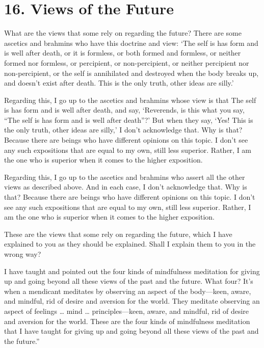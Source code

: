 \documentclass[12pt,openany]{book}%
\begin{document}
\section*{16. Views of the Future }

What are the views that some rely on regarding the future? There are some ascetics and brahmins who have this doctrine and view: ‘The self is has form and is well after death, or it is formless, or both formed and formless, or neither formed nor formless, or percipient, or non-percipient, or neither percipient nor non-percipient, or the self is annihilated and destroyed when the body breaks up, and doesn’t exist after death. This is the only truth, other ideas are silly.’ 

Regarding this, I go up to the ascetics and brahmins whose view is that The self is has form and is well after death, and say, ‘Reverends, is this what you say, “The self is has form and is well after death”?’ But when they say, ‘Yes! This is the only truth, other ideas are silly,’ I don’t acknowledge that. Why is that? Because there are beings who have different opinions on this topic. I don’t see any such expositions that are equal to my own, still less superior. Rather, I am the one who is superior when it comes to the higher exposition. 

Regarding this, I go up to the ascetics and brahmins who assert all the other views as described above. And in each case, I don’t acknowledge that. Why is that? Because there are beings who have different opinions on this topic. I don’t see any such expositions that are equal to my own, still less superior. Rather, I am the one who is superior when it comes to the higher exposition. 

These are the views that some rely on regarding the future, which I have explained to you as they should be explained. Shall I explain them to you in the wrong way? 

I have taught and pointed out the four kinds of mindfulness meditation for giving up and going beyond all these views of the past and the future. What four? It’s when a mendicant meditates by observing an aspect of the body—keen, aware, and mindful, rid of desire and aversion for the world. They meditate observing an aspect of feelings … mind … principles—keen, aware, and mindful, rid of desire and aversion for the world. These are the four kinds of mindfulness meditation that I have taught for giving up and going beyond all these views of the past and the future.” 
\end{document}
